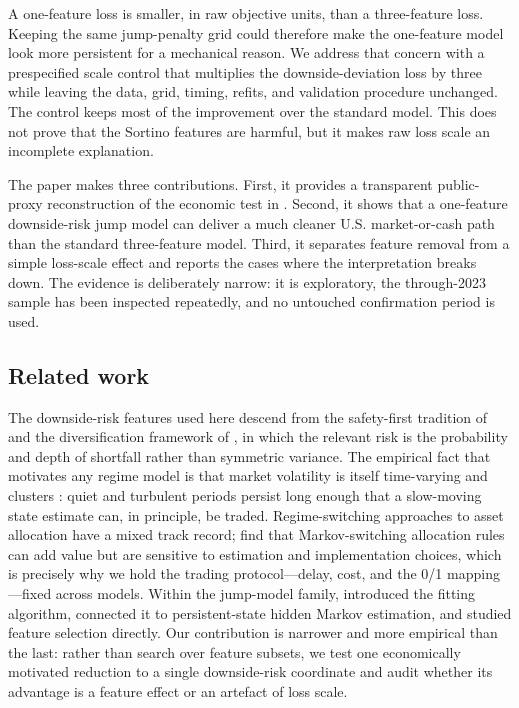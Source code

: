 \documentclass[11pt]{article}
\begin{document}
A one-feature loss is smaller, in raw objective units, than a three-feature
loss. Keeping the same jump-penalty grid could therefore make the one-feature
model look more persistent for a mechanical reason. We address that concern with
a prespecified scale control that multiplies the downside-deviation loss by
three while leaving the data, grid, timing, refits, and validation procedure
unchanged. The control keeps most of the improvement over the standard model.
This does not prove that the Sortino features are harmful, but it makes raw loss
scale an incomplete explanation.

The paper makes three contributions. First, it provides a transparent
public-proxy reconstruction of the economic test in \citet{shu2024}. Second, it
shows that a one-feature downside-risk jump model can deliver a much cleaner U.S.
market-or-cash path than the standard three-feature model. Third, it separates
feature removal from a simple loss-scale effect and reports the cases where the
interpretation breaks down. The evidence is deliberately narrow: it is
exploratory, the through-2023 sample has been inspected repeatedly, and no
untouched confirmation period is used.

\subsection{Related work}

The downside-risk features used here descend from the safety-first tradition of
\citet{roy1952} and the diversification framework of \citet{markowitz1959}, in
which the relevant risk is the probability and depth of shortfall rather than
symmetric variance. The empirical fact that motivates any regime model is that
market volatility is itself time-varying and clusters
\citep{schwert1989,pagan2003}: quiet and turbulent periods persist long enough
that a slow-moving state estimate can, in principle, be traded. Regime-switching
approaches to asset allocation have a mixed track record; \citet{bulla2011} find
that Markov-switching allocation rules can add value but are sensitive to
estimation and implementation choices, which is precisely why we hold the
trading protocol---delay, cost, and the 0/1 mapping---fixed across models.
Within the jump-model family, \citet{bemporad2018} introduced the fitting
algorithm, \citet{nystrup2020} connected it to persistent-state hidden Markov
estimation, and \citet{nystrup2021} studied feature selection directly. Our
contribution is narrower and more empirical than the last: rather than search
over feature subsets, we test one economically motivated reduction to a single
downside-risk coordinate and audit whether its advantage is a feature effect or
an artefact of loss scale.
\end{document}
